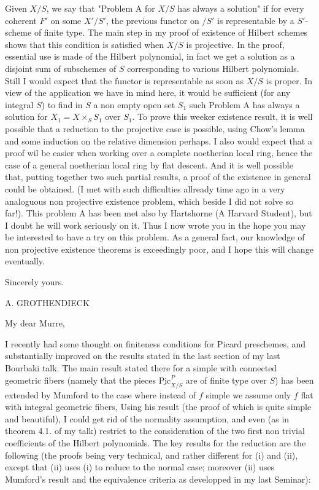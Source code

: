 \documentclass[11pt,a4paper]{article}
\begin{document}
Given $X/S$, we say that "Problem A for $X/S$ has always a solution" if for every coherent $F'$ on some $X'/S'$, the previous functor on $/S'$ is representable by a $S'$-scheme of finite type. The main step in my proof of existence of Hilbert schemes shows that this condition is satisfied when $X/S$ is projective. In the proof, essential use is made of the Hilbert polynomial, in fact we get a solution as a disjoint sum of subschemes of $S$ corresponding to various Hilbert polynomials. Still I would expect that the functor is representable as soon as $X/S$ is proper. In view of the application we have in mind here, it would be sufficient (for any integral $S$) to find in $S$ a non empty open set $S_1$ such Problem A has always a solution for $X_1 = X \times_S S_1$ over $S_1$. To prove this weeker existence result, it is well possible that a reduction to the projective case is possible, using Chow's lemma and some induction on the relative dimension perhaps. I also would expect that a proof wil be easier when working over a complete noetherian local ring, hence the case of a general noetherian local ring by flat descent. And it is well possible that, putting together two such partial results, a proof of the existence in general could be obtained. (I met with such difficulties allready time ago in a very analoguous non projective existence problem, which beside I did not solve so far!). This problem A has been met also by Hartshorne (A Harvard Student), but I doubt he will work seriously on it. Thus I now wrote you in the hope you may be interested to have a try on this problem. As a general fact, our knowledge of non projective existence theorems is exceedingly poor, and I hope this will change eventually.

Sincerely yours.

A. GROTHENDIECK


My dear Murre,

I recently had some thought on finiteness conditions for Picard preschemes, and substantially improved on the results stated in the last section of my last Bourbaki talk. The main result stated there for a simple   with connected geometric fibers (namely that the pieces $\underline{\mathrm{Pic}}^{P}_{X/S}$ are of finite type over $S$) has been extended by Mumford to the case where  instead of $f$ simple we assume only $f$ flat with integral geometric fibers,  Using his result (the proof of which is quite simple and beautiful), I could get rid of the normality assumption, and even (as in theorem 4.1. of my talk) restrict to the consideration of the two first non trivial coefficients of the Hilbert polynomials. The key results for the reduction are the following (the proofs being very technical, and rather different for (i) and (ii), except that (ii) uses (i)  to reduce to the normal case; moreover (ii) uses Mumford's result and the equivalence criteria as developped in my last Seminar):
\end{document}
